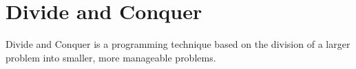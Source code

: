 \documentclass[12pt,a4paper,yellow]{bbe}
\begin{document}
			
	\chapter*{Divide and Conquer}
	Divide and Conquer is a programming technique based on the
	division of a larger problem into smaller, more manageable
	problems.
 
\end{document}
